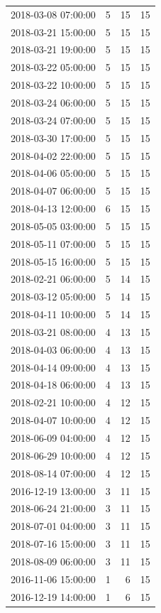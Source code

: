 \begin{tabular}{lrrr}
2018-03-08 07:00:00 & 5 & 15 & 15 \\
2018-03-21 15:00:00 & 5 & 15 & 15 \\
2018-03-21 19:00:00 & 5 & 15 & 15 \\
2018-03-22 05:00:00 & 5 & 15 & 15 \\
2018-03-22 10:00:00 & 5 & 15 & 15 \\
2018-03-24 06:00:00 & 5 & 15 & 15 \\
2018-03-24 07:00:00 & 5 & 15 & 15 \\
2018-03-30 17:00:00 & 5 & 15 & 15 \\
2018-04-02 22:00:00 & 5 & 15 & 15 \\
2018-04-06 05:00:00 & 5 & 15 & 15 \\
2018-04-07 06:00:00 & 5 & 15 & 15 \\
2018-04-13 12:00:00 & 6 & 15 & 15 \\
2018-05-05 03:00:00 & 5 & 15 & 15 \\
2018-05-11 07:00:00 & 5 & 15 & 15 \\
2018-05-15 16:00:00 & 5 & 15 & 15 \\
2018-02-21 06:00:00 & 5 & 14 & 15 \\
2018-03-12 05:00:00 & 5 & 14 & 15 \\
2018-04-11 10:00:00 & 5 & 14 & 15 \\
2018-03-21 08:00:00 & 4 & 13 & 15 \\
2018-04-03 06:00:00 & 4 & 13 & 15 \\
2018-04-14 09:00:00 & 4 & 13 & 15 \\
2018-04-18 06:00:00 & 4 & 13 & 15 \\
2018-02-21 10:00:00 & 4 & 12 & 15 \\
2018-04-07 10:00:00 & 4 & 12 & 15 \\
2018-06-09 04:00:00 & 4 & 12 & 15 \\
2018-06-29 10:00:00 & 4 & 12 & 15 \\
2018-08-14 07:00:00 & 4 & 12 & 15 \\
2016-12-19 13:00:00 & 3 & 11 & 15 \\
2018-06-24 21:00:00 & 3 & 11 & 15 \\
2018-07-01 04:00:00 & 3 & 11 & 15 \\
2018-07-16 15:00:00 & 3 & 11 & 15 \\
2018-08-09 06:00:00 & 3 & 11 & 15 \\
2016-11-06 15:00:00 & 1 & 6 & 15 \\
2016-12-19 14:00:00 & 1 & 6 & 15 \\

\end{tabular}
